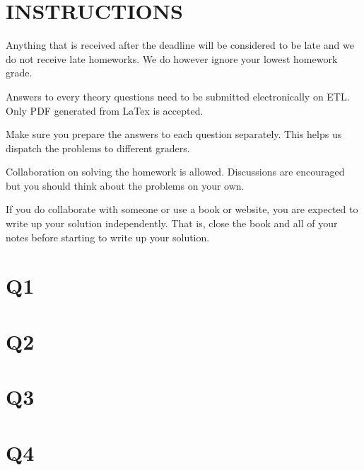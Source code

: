 \documentclass{article}
\begin{document}
\pagestyle{fancy}

\section*{INSTRUCTIONS}

\begin{itemize*}
\item Anything
  that is received after the deadline will be considered to be late and we do not receive late homeworks. We do however ignore your lowest homework grade. 
\item Answers to every theory questions need to be submitted
  electronically on ETL. Only PDF generated from LaTex is accepted.
\item Make sure you prepare the answers to each question
  separately. This helps us dispatch the problems to different graders.
\item Collaboration on solving the homework is allowed. Discussions
  are encouraged but you should think about the problems on your own. 
\item If you do collaborate with someone or use a book or website, you
  are expected to write up your solution independently.  That is,
  close the book and all of your notes before starting to write up
  your solution. 
\end{itemize*}


\section{Q1}

\section{Q2}

\section{Q3}

\section{Q4}
\end{document}
